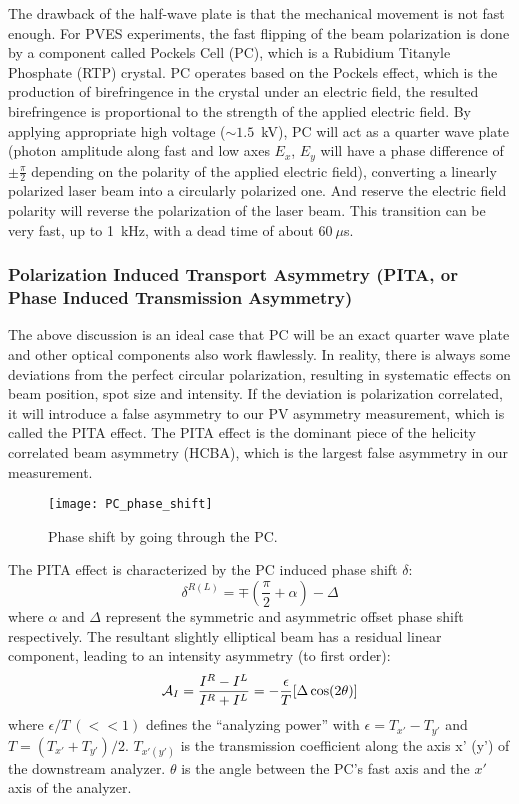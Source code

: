 The drawback of the half-wave plate is that the mechanical movement is not fast enough. 
For PVES experiments, the fast flipping of the beam polarization is done by a component 
called Pockels Cell (PC), which is a Rubidium Titanyle Phosphate (RTP) crystal. 
PC operates based on the Pockels effect, 
which is the production of birefringence in the crystal under an electric field, 
the resulted birefringence is proportional to the strength of the
applied electric field. By applying appropriate high voltage ($\sim 1.5$~kV),
PC will act as a quarter wave plate (photon amplitude along fast and low axes
$E_x$, $E_y$ will have a phase difference of $\pm \frac{\pi}{2}$ depending on
the polarity of the applied electric field), converting a linearly polarized laser beam
into a circularly polarized one. And reserve the electric field polarity
will reverse the polarization of the laser beam. This transition can be very
fast, up to 1~kHz, with a dead time of about $60\ \mu$s.

\subsubsection{Polarization Induced Transport Asymmetry (PITA, or Phase Induced Transmission Asymmetry) \cite{Caryn2019}}
The above discussion is an ideal case that PC will be an exact quarter wave
plate and other optical components also work flawlessly. In reality, there is always 
some deviations from the perfect circular polarization,
resulting in systematic effects on beam position, spot size and intensity. If the deviation 
is polarization correlated, it will introduce a false asymmetry to our PV asymmetry 
measurement, which is called the PITA effect. The PITA effect is the dominant
piece of the helicity correlated beam asymmetry (HCBA), which is the largest false asymmetry 
in our measurement.

\begin{figure}[!h]
    \centering
    \texttt{[image: PC\_phase\_shift]}
    \caption{Phase shift by going through the PC.}
    \label{fig:pc_phase_shift}
\end{figure}

The PITA effect is characterized by the PC induced phase shift $\delta$:
\begin{equation}
    \delta^{R(L)} = \mp\left(\frac{\pi}{2} + \alpha \right) - \Delta
\end{equation}
where $\alpha$ and $\Delta$ represent the symmetric and asymmetric offset phase
shift respectively. The resultant slightly elliptical beam has a residual
linear component, leading to an intensity asymmetry (to first order):
\begin{equation}
    \mathcal{A}_{I} = \frac{I^R - I^L}{I^R + I^L} = -\frac{\epsilon}{T}[\Delta\cos(2\theta)]
\end{equation}
where $\epsilon/T \ (<<1)$ defines the ``analyzing power'' with $\epsilon = T_{x'} - T_{y'}$ 
and $T = (T_{x'} + T_{y'})/2$.
$T_{x' (y')}$ is the transmission coefficient along the axis x' (y') of the
downstream analyzer. $\theta$ is the angle between the PC's fast axis and the 
$x'$ axis of the analyzer.

